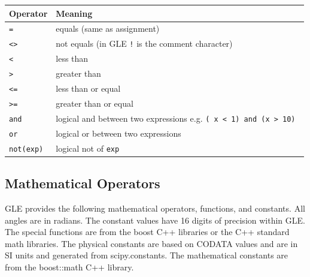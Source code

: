 \begin{supertabular}{lp{10cm}}
\hline
Operator & Meaning  \\
 \hline
{\tt =} \index{=}      & equals (same as assignment) \\
{\tt \textless \textgreater} \index{\textless \textgreater}  & not equals (in GLE {\tt !} is the comment character)  \\
{\tt \textless } \index{\textless} & less than\\
{\tt \textgreater } \index{\textgreater}  & greater than\\
{\tt \textless =} \index{\textless =}  & less than or equal \\
{\tt \textgreater =} \index{\textgreater =}  & greater than or equal \\
{\tt and}      & logical and between two expressions e.g. {\tt ( x \textless\ 1) and  (x \textgreater\ 10) }\\
{\tt or}      & logical or between two expressions\\
{\tt not(exp)}    & logical not of {\tt exp} \\
\end{supertabular}

\subsection{Mathematical Operators}

GLE provides the following mathematical operators, functions, and constants.  All angles are in radians. The constant values have 16 digits of precision within GLE.  The special functions are from the boost C++ libraries or the C++ standard math libraries.  The physical constants are based on CODATA values and are in SI units and generated from scipy.constants.  The mathematical constants are from the boost::math C++ library.

\vspace{2ex}

